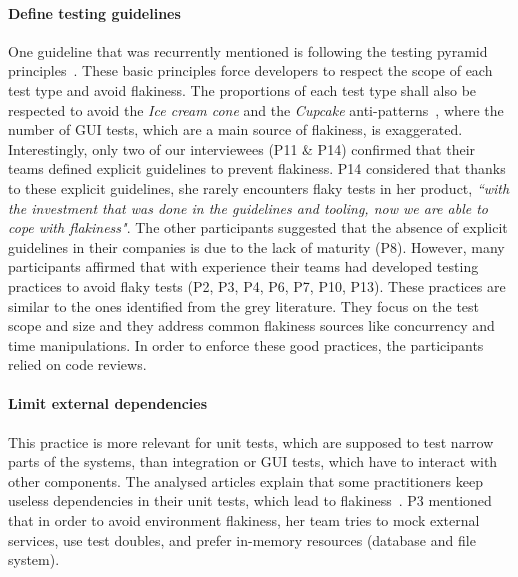 \paragraph{\textbf{Define testing guidelines}}
One guideline that was recurrently mentioned is following the testing pyramid principles~\cite{FlakyTes87:online,Managing72:online,Effectiv86:online}.
These basic principles force developers to respect the scope of each test type and avoid flakiness.
The proportions of each test type shall also be respected to avoid the \textit{Ice cream cone} and the \textit{Cupcake} anti-patterns~\cite{Introduc67:online}, where the number of GUI tests, which are a main source of flakiness, is exaggerated.
Interestingly, only two of our interviewees (P11 \& P14) confirmed that their teams defined explicit guidelines to prevent flakiness.
P14 considered that thanks to these explicit guidelines, she rarely encounters flaky tests in her product, \textit{``with the investment that was done in the guidelines and tooling, now we are able to cope with flakiness"}.
The other participants suggested that the absence of explicit guidelines in their companies is due to the lack of maturity (P8).
However, many participants affirmed that with experience their teams had developed testing practices to avoid flaky tests (P2, P3, P4, P6, P7, P10, P13).
These practices are similar to the ones identified from the grey literature.
They focus on the test scope and size and they address common flakiness sources like concurrency and time manipulations.
In order to enforce these good practices, the participants relied on code reviews.

\paragraph{\textbf{Limit external dependencies}}
This practice is more relevant for unit tests, which are supposed to test narrow parts of the systems, than integration or GUI tests, which have to interact with other components.
The analysed articles explain that some practitioners keep useless dependencies in their unit tests, which lead to flakiness~\cite{Managing72:online,TestStab71:online}.
P3 mentioned that in order to avoid environment flakiness, her team tries to mock external services, use test doubles, and prefer in-memory resources (\eg database and file system).


